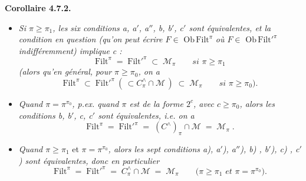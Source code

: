 \documentclass[11pt]{article}
\newcommand{\Mc}{\mathcal{M}}
\begin{document}
\textbf{Corollaire 4.7.2.}
\begin{itemize}[leftmargin=4em]
\item[\textit{1°)}] \textit{Si $\pi \geqslant \pi_1$, les six conditions a, a$'$, a$''$, b, b$'$, c$'$ sont équivalentes, et la condition en question (qu'on peut écrire $F \in$} $\mathrm{Ob}\,\mathrm{Filt}^{\pi}$ \textit{où $F \in$} $\mathrm{Ob}\,\mathrm{Filt}'^{\pi}$ \textit{indifféremment) implique c :} %
\[
\mathrm{Filt}^{\pi} \;=\; \mathrm{Filt}'^{\pi} \;\subset\; \Mc_{\pi} \qquad \textit{si } \pi \geqslant \pi_1 \tag*{(4.7.2.1)}
\]
\textit{(alors qu'en général, pour $\pi \geqslant \pi_0$, on a}
\[
\mathrm{Filt}^{\pi} \;\subset\; \mathrm{Filt}'^{\pi}\ (\,\subset C^{\wedge}_{\pi} \cap \Mc\,) \;\subset\; \Mc_{\pi} \qquad \textit{si } \pi \geqslant \pi_0\textit{).} \tag*{(4.7.2.2)}
\]
\item[\textit{2°)}] \textit{Quand $\pi = \pi^{\pi_0}$, p.ex. quand $\pi$ est de la forme $2^{c}$, avec $c \geqslant \pi_0$, alors les conditions b, b$'$, c, c$'$ sont équivalentes, i.e. on a}
\[
\mathrm{Filt}^{\pi} \;=\; \mathrm{Filt}'^{\pi} \;=\; (C^{\wedge})_{\pi} \cap \Mc \;=\; \Mc_{\pi}\;. \tag*{(4.7.3.2)} %
\]
\item[\textit{3°)}] \textit{Quand $\pi \geqslant \pi_1$} et \textit{$\pi = \pi^{\pi_0}$, alors les sept conditions a), a$'$), a$''$), b) , b$'$), c) , c$'$) sont équivalentes, donc en particulier}
\[
\mathrm{Filt}^{\pi} \;=\; \mathrm{Filt}'^{\pi} \;=\; C^{\wedge}_{\pi} \cap \Mc \;=\; \Mc_{\pi} \qquad (\pi \geqslant \pi_1 \textit{ et } \pi = \pi^{\pi_0}\textit{).} \tag*{(4.7.2.4)}
\]
\end{itemize}
\end{document}
